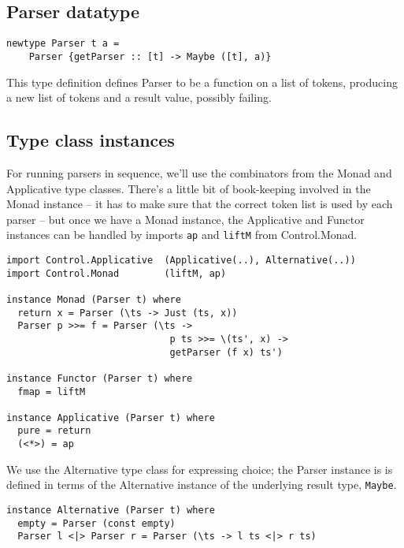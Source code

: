 \documentclass{tmr}
\begin{document}
\subsection{Parser datatype}

\begin{verbatim}
newtype Parser t a = 
    Parser {getParser :: [t] -> Maybe ([t], a)}
\end{verbatim}
This type definition defines Parser to be a function
on a list of tokens, producing a new list of tokens and a result
value, possibly failing.

\subsection{Type class instances}
For running parsers in sequence, we'll use the combinators from the Monad and
Applicative type classes.  There's a little bit of book-keeping involved in the
Monad instance -- it has to make sure that the correct token list is used by
each parser -- but once we have a Monad instance, the Applicative and Functor
instances can be handled by imports \verb+ap+ and \verb+liftM+ from Control.Monad.
\begin{verbatim}
import Control.Applicative  (Applicative(..), Alternative(..))
import Control.Monad        (liftM, ap)

instance Monad (Parser t) where
  return x = Parser (\ts -> Just (ts, x))
  Parser p >>= f = Parser (\ts ->
                             p ts >>= \(ts', x) ->
                             getParser (f x) ts')

instance Functor (Parser t) where
  fmap = liftM

instance Applicative (Parser t) where
  pure = return
  (<*>) = ap
\end{verbatim}

We use the Alternative type class for expressing choice; the Parser instance is
is defined in terms of the Alternative instance of the
underlying result type, \verb+Maybe+.
\begin{verbatim}
instance Alternative (Parser t) where
  empty = Parser (const empty)
  Parser l <|> Parser r = Parser (\ts -> l ts <|> r ts)
\end{verbatim}
\end{document}

